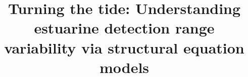 \documentclass[doublespacing,linenumbers]{bmcart}
\begin{document}
\begin{frontmatter}

\begin{fmbox}


\title{Turning the tide: Understanding estuarine detection range variability via structural equation models}


\author[
   addressref={aff1},                   %
   corref={aff1},                       %
   noteref={n1},                        %
   email={stijn.bruneel@ugent.be}   %
]{ }
\author[
   addressref={aff2},
   email={jolien.goossens@ugent.be}
]{ }
\author[
   addressref={aff3},
   email={jan.reubens@ugent.be}
]{ }
\author[
   addressref={aff4},
   email={ine.pauwels@inbo.be}
]{ }
\author[
   addressref={aff2},
   email={tom.moens@ugent.be}
]{ }
\author[
   addressref={aff1},
   email={peter.goethals@ugent.be}
]{ }
\author[
   addressref={aff2,aff4},
   email={pieterjan.verhelst@inbo.be}
]{ }



\end{fmbox}
\end{frontmatter}
\end{document}
